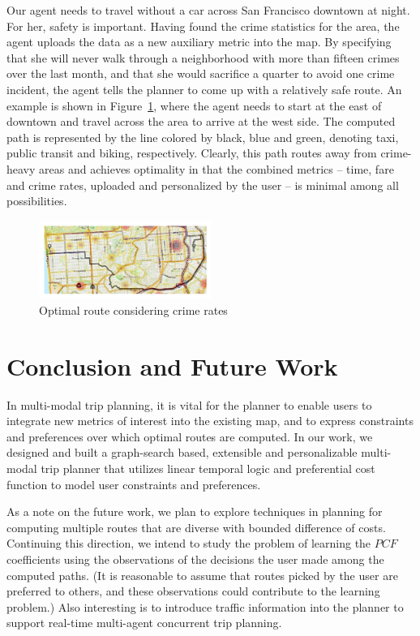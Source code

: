 \documentclass[letterpaper]{article}
\newcommand{\PCF}{\mathit{PCF}}
\newcommand{\figref}[1]{Figure~\ref{fig:#1}}
\begin{document}
Our agent needs to travel without a car across San Francisco downtown at night.
For her, safety is important.
Having found the crime statistics for the area, the agent uploads
the data as a new auxiliary metric into the map.
By specifying that she will never walk through a neighborhood
with more than fifteen crimes over the last month, and that
she would sacrifice a quarter to avoid one crime incident,
the agent tells the planner to come up with a relatively safe
route. An example is shown in \figref{crime}, where the agent
needs to start at the east of downtown and travel across the area
to arrive at the west side.  
The computed path is represented by the line colored by black,
blue and green, denoting taxi, public transit and biking, respectively.
Clearly, this path routes away from crime-heavy areas and achieves
optimality in that the combined metrics -- time, fare and crime rates,
uploaded and personalized by the user -- is minimal among all possibilities.

\begin{figure}[!ht]
  \centering
    \includegraphics[width=0.5\textwidth]{figs/crime.pdf}
  \caption{Optimal route considering crime rates\label{fig:crime}}
\end{figure}



\section{Conclusion and Future Work}
In multi-modal trip planning, it is vital for the planner to enable
users to integrate new metrics of interest into the existing map,
and to express constraints and preferences over which optimal
routes are computed.
In our work, we designed and built a graph-search based, extensible
and personalizable multi-modal trip planner that utilizes linear
temporal logic and preferential cost
function to model user constraints and preferences.

As a note on the future work, we plan to explore techniques in planning
for computing multiple routes that are diverse with bounded difference of costs.
Continuing this direction, we intend to study the problem of learning the
$\PCF$ coefficients using the observations of the decisions the user made among
the computed paths. (It is reasonable to assume that routes picked by the user
are preferred to others, and these observations could contribute to the learning
problem.)
Also interesting is to introduce traffic information into the planner
to support real-time multi-agent concurrent trip planning.




\end{document}
